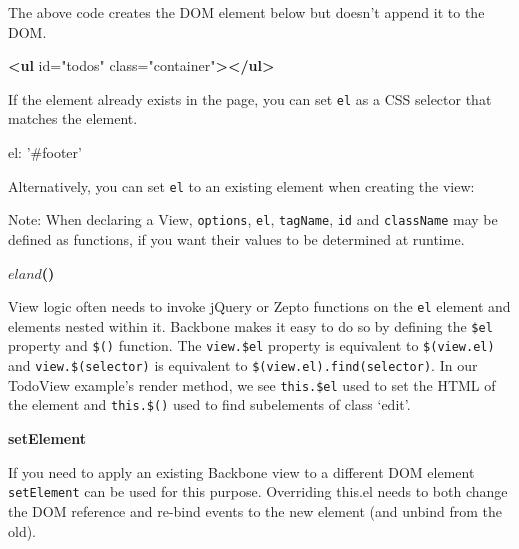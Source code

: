 \documentclass[9pt]{book}
\newenvironment{Shaded}{}{}
\newcommand{\KeywordTok}[1]{\textcolor[rgb]{0.00,0.44,0.13}{\textbf{{#1}}}}
\newcommand{\DataTypeTok}[1]{\textcolor[rgb]{0.56,0.13,0.00}{{#1}}}
\newcommand{\StringTok}[1]{\textcolor[rgb]{0.25,0.44,0.63}{{#1}}}
\newcommand{\OtherTok}[1]{\textcolor[rgb]{0.00,0.44,0.13}{{#1}}}
\newcommand{\FunctionTok}[1]{\textcolor[rgb]{0.02,0.16,0.49}{{#1}}}
\newcommand{\NormalTok}[1]{{#1}}
\begin{document}
The above code creates the DOM element below but doesn't append it to
the DOM.

\begin{Shaded}
\begin{Highlighting}[]
\KeywordTok{<ul}\OtherTok{ id=}\StringTok{"todos"}\OtherTok{ class=}\StringTok{"container"}\KeywordTok{></ul>}
\end{Highlighting}
\end{Shaded}

If the element already exists in the page, you can set \texttt{el} as a
CSS selector that matches the element.

\begin{Shaded}
\begin{Highlighting}[]
\NormalTok{el: }\StringTok{'#footer'}
\end{Highlighting}
\end{Shaded}

Alternatively, you can set \texttt{el} to an existing element when
creating the view:

\begin{Shaded}
\end{Shaded}

Note: When declaring a View, \texttt{options}, \texttt{el},
\texttt{tagName}, \texttt{id} and \texttt{className} may be defined as
functions, if you want their values to be determined at runtime.

\textbf{$el and $()}

View logic often needs to invoke jQuery or Zepto functions on the
\texttt{el} element and elements nested within it. Backbone makes it
easy to do so by defining the \texttt{\$el} property and \texttt{\$()}
function. The \texttt{view.\$el} property is equivalent to
\texttt{\$(view.el)} and \texttt{view.\$(selector)} is equivalent to
\texttt{\$(view.el).find(selector)}. In our TodoView example's render
method, we see \texttt{this.\$el} used to set the HTML of the element
and \texttt{this.\$()} used to find subelements of class `edit'.

\textbf{setElement}

If you need to apply an existing Backbone view to a different DOM
element \texttt{setElement} can be used for this purpose. Overriding
this.el needs to both change the DOM reference and re-bind events to the
new element (and unbind from the old).
\end{document}
